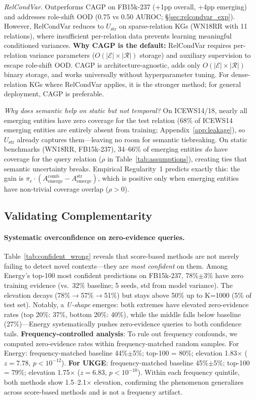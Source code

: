 \emph{RelCondVar.} Outperforms CAGP on FB15k-237 (+1pp overall, +4pp emerging) and addresses role-shift OOD (0.75 vs 0.50 AUROC; \S\ref{sec:relcondvar_exp}). However, RelCondVar reduces to $U_{\text{str}}$ on sparse-relation KGs (WN18RR with 11 relations), where insufficient per-relation data prevents learning meaningful conditioned variances. \textbf{Why CAGP is the default:} RelCondVar requires per-relation variance parameters ($O(|\mathcal{E}| \times |\mathcal{R}|)$ storage) and auxiliary supervision to escape role-shift OOD. CAGP is architecture-agnostic, adds only $O(|\mathcal{E}| \times |\mathcal{R}|)$ binary storage, and works universally without hyperparameter tuning. For dense-relation KGs where RelCondVar applies, it is the stronger method; for general deployment, CAGP is preferable.

\emph{Why does semantic help on static but not temporal?} On ICEWS14/18, nearly all emerging entities have zero coverage for the test relation (68\% of ICEWS14 emerging entities are entirely absent from training; Appendix~\ref{app:leakage}), so $U_{\text{str}}$ already captures them---leaving no room for semantic tiebreaking. On static benchmarks (WN18RR, FB15k-237), 34--66\% of emerging entities \emph{do} have coverage for the query relation ($\rho$ in Table~\ref{tab:assumptions}), creating ties that semantic uncertainty breaks. Empirical Regularity~1 predicts exactly this: the gain is $\pi_e \cdot (A_{\text{emerge}}^{\text{comb}} - A_{\text{emerge}}^{\text{str}})$, which is positive only when emerging entities have non-trivial coverage overlap ($\rho > 0$).

\subsection{Validating Complementarity}

\paragraph{Systematic overconfidence on zero-evidence queries.}
Table~\ref{tab:confident_wrong} reveals that score-based methods are not merely failing to detect novel contexts---they are \emph{most confident} on them. Among Energy's top-100 most confident predictions on FB15k-237, 78\%$\pm$3\% have zero training evidence (vs.\ 32\% baseline; 5 seeds, std from model variance). The elevation decays (78\%$\to$57\%$\to$51\%) but stays above 50\% up to K=1000 (5\% of test set). Notably, a \emph{U-shape} emerges: both extremes have elevated zero-evidence rates (top 20\%: 37\%, bottom 20\%: 40\%), while the middle falls below baseline (27\%)---Energy systematically pushes zero-evidence queries to both confidence tails. \textbf{Frequency-controlled analysis}: To rule out frequency confounds, we computed zero-evidence rates within frequency-matched random samples. For Energy: frequency-matched baseline 44\%$\pm$5\%; top-100 = 80\%; elevation 1.83$\times$ ($z{=}7.78$, $p{<}10^{-12}$). \textbf{For UKGE}: frequency-matched baseline 45\%$\pm$5\%; top-100 = 79\%; elevation 1.75$\times$ ($z{=}6.83$, $p{<}10^{-10}$). Within each frequency quintile, both methods show 1.5--2.1$\times$ elevation, confirming the phenomenon generalizes across score-based methods and is not a frequency artifact.

